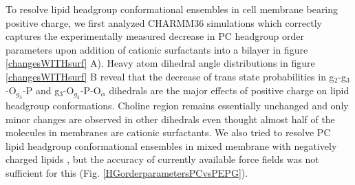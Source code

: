 \documentclass[aps,prl,superscriptaddress,twocolumn]{revtex4}
\begin{document}
To resolve lipid headgroup conformational ensembles in cell membrane bearing positive charge,
we first analyzed CHARMM36 simulations which correctly captures the experimentally measured decrease in PC headgroup order parameters
upon addition of cationic surfactants into a bilayer in figure \ref{changesWITHsurf} A).
Heavy atom dihedral angle distributions in figure \ref{changesWITHsurf} B
reveal that the decrease of trans state probabilities in g$_2$-g$_3$-O$_{g_3}$-P and g$_3$-O$_{g_3}$-P-O$_\alpha$
dihedrals are the major effects of positive charge on lipid headgroup conformations.
Choline region remains essentially unchanged and only minor changes are observed in other dihedrals
even thought almost half of the molecules in membranes are cationic surfactants.
We also tried to resolve PC lipid headgroup conformational ensembles in mixed membrane with
negatively charged lipids \cite{scherer87},
but the accuracy of currently available force fields
was not sufficient for this (Fig. \ref{HGorderparametersPCvsPEPG}).
\end{document}

